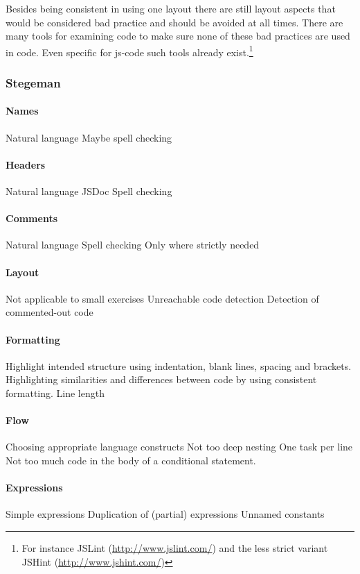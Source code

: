 Besides being consistent in using one layout
there are still layout aspects that would be considered bad practice
and should be avoided at all times.
There are many \glspl{tool} for examining \gls{code}
to make sure none of these bad practices are used in \gls{code}.
Even specific for \gls{js-code} such \glspl{tool} already
exist.\footnote{For instance JSLint (\url{http://www.jslint.com/})
and the less strict variant JSHint (\url{http://www.jshint.com/})}

\subsubsection{Stegeman}

\paragraph{Names}
Natural language
Maybe spell checking

\paragraph{Headers}
Natural language
JSDoc
Spell checking

\paragraph{Comments}
Natural language
Spell checking
Only where strictly needed

\paragraph{Layout}
Not applicable to small exercises
Unreachable code detection
Detection of commented-out code

\paragraph{Formatting}
Highlight intended structure using
indentation, blank lines, spacing and brackets.
Highlighting similarities and differences between code
by using consistent formatting.
Line length

\paragraph{Flow}
Choosing appropriate language constructs
Not too deep nesting
One task per line
Not too much code in the body of a conditional statement.

\paragraph{Expressions}
Simple expressions
Duplication of (partial) expressions
Unnamed constants

